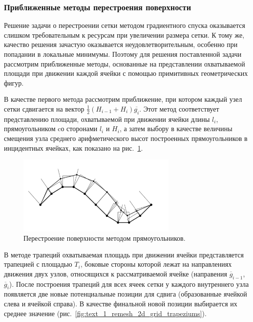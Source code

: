 \subsubsection{Приближенные методы перестроения поверхности}

Решение задачи о перестроении сетки методом градиентного спуска оказывается слишком требовательным к ресурсам при увеличении размера сетки.
К тому же, качество решения зачастую оказывается неудовлетворительным, особенно при попадании в локальные минимумы.
Поэтому для решения поставленной задачи рассмотрим приближенные методы, основанные на представлении охватываемой площади при движении каждой ячейки с помощью примитивных геометрических фигур.

В качестве первого метода рассмотрим приближение, при котором каждый узел сетки сдвигается на вектор $\frac{1}{2}(H_{i - 1} + H_i)\overline{g_i}$.
Этот метод соответствует представлению площади, охватываемой при движении ячейки длины $l_i$, прямоугольником cо сторонами $l_i$ и $H_i$, а затем выбору в качестве величины смещения узла среднего арифметического высот построенных прямоугольников в инцидентных ячейках, как показано на рис.~\ref{fig:text_1_remesh_2d_grid_rectangles}.

\begin{figure}[h]
\centering
\includegraphics[width=0.7\textwidth]{pics/text_1_remesh_2d/grid_rectangles.pdf}
\caption{Перестроение поверхности методом прямоугольников.}
\label{fig:text_1_remesh_2d_grid_rectangles}
\end{figure}

В методе трапеций охватываемая площадь при движении ячейки представляется трапецией с площадью $T_i$, боковые стороны которой лежат на направлениях движения двух узлов, относящихся к рассматриваемой ячейке (направения $\overline{g}_{i - 1}$, $\overline{g}_i$).
После построения трапеций для всех ячеек сетки у каждого внутреннего узла появляется две новые потенциальные позиции для сдвига (образованные ячейкой слева и ячейкой справа).
В качестве финальной новой позиции выбирается их среднее значение (рис.~\ref{fig:text_1_remesh_2d_grid_trapeziums}).


